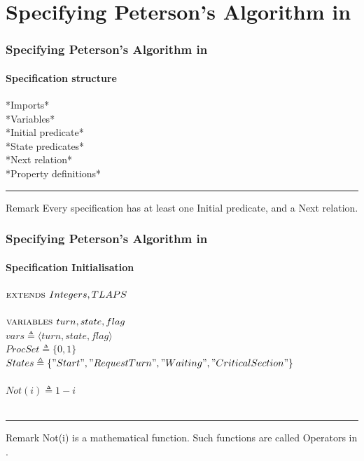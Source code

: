 \documentclass[xcolor=dvipsnames]{beamer}
\begin{document}
\section{Specifying Peterson's Algorithm in \tla}
\begin{frame}
	\frametitle{Specifying Peterson's Algorithm in \tla}
	\framesubtitle{Specification structure}
		
		*Imports*\\
		*Variables*\\
		*Initial predicate*\\
		*State predicates*\\
		*Next relation*\\

		*Property definitions*
		\hrule
		\begin{block}{Remark}
			Every specification has at least one Initial predicate, and a Next relation.
		\end{block}
\end{frame}

\begin{frame}
	\frametitle{Specifying Peterson's Algorithm in \tla}
	\framesubtitle{Specification Initialisation}
	
	
	$\mbox{\textsc{extends }} Integers, TLAPS$\\~\\
	
	$\mbox{\textsc{variables }} turn, state, flag$\\
	$vars \triangleq  \langle turn, state, flag \rangle$\\
	$ProcSet \triangleq \{0,1\} $\\
	$States \triangleq \{"Start", "RequestTurn", "Waiting", "CriticalSection"\} $\\~\\
	
	$Not(i) \triangleq 1-i $\\~\\
	\hrule
	\begin{block}{Remark}
		Not(i) is a mathematical function. Such functions are called Operators in \tla.
	\end{block}
	
\end{frame}
\end{document}
